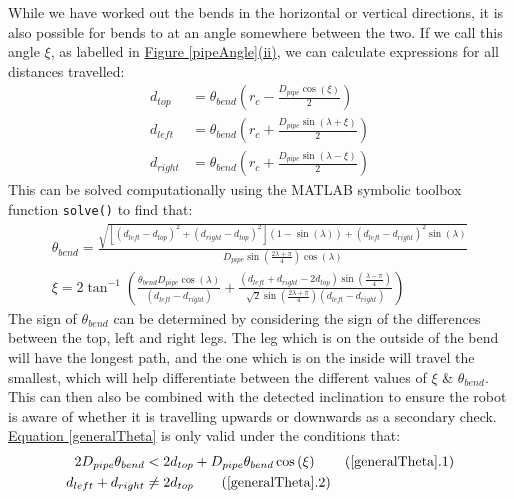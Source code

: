 \documentclass[11pt]{article}		%
\begin{document}
		While we have worked out the bends in the horizontal or vertical directions, it is also possible for bends to at an angle somewhere between the two.
		If we call this angle $\xi$, as labelled in \hyperref[pipeAngle]{Figure \ref*{pipeAngle}(ii)}, we can calculate expressions for all distances travelled:
		\begin{align}
			d_{top} &= \theta_{bend} \left( r_c - \frac{D_{pipe} \cos \left( \xi \right)}{2} \right) \label{d_top}
			\\
			d_{left} &= \theta_{bend} \left( r_c +  \frac{D_{pipe} \sin \left( \lambda + \xi \right)}{2} \right) \label{d_left}
			\\
			d_{right} &= \theta_{bend} \left( r_c +  \frac{D_{pipe} \sin \left( \lambda - \xi \right)}{2} \right) \label{d_right}
		\end{align}
		This can be solved computationally using the MATLAB symbolic toolbox function \verb|solve()| to find that:
		\begin{align}
			\theta_{bend} = \frac{ \sqrt{ \left[ \left( d_{left} - d_{top} \right)^2 + \left( d_{right} - d_{top} \right)^2 \right] \left( 1 - \sin \left( \lambda \right) \right)  + \left( d_{left} - d_{right} \right)^2 \sin \left( \lambda \right) } } {D_{pipe} \sin \left( \frac{2 \lambda + \pi}{4} \right) \cos \left( \lambda \right)} \label{generalTheta}
			\\
			\xi = 2 \tan^{-1} \left( \frac{\theta_{bend} D_{pipe} \cos \left( \lambda \right)}{\left( d_{left} - d_{right} \right)} + \frac{\left(d_{left} + d_{right} - 2 d_{top} \right) \sin \left( \frac{\lambda - \pi}{4} \right)}{\sqrt{2} \sin \left( \frac{2 \lambda + \pi}{4} \right) \left( d_{left} - d_{right} \right)}\right) \label{alphaEq}
		\end{align}
		The sign of $\theta_{bend}$ can be determined by considering the sign of the differences between the top, left and right legs.
		The leg which is on the outside of the bend will have the longest path, and the one which is on the inside will travel the smallest, which will help differentiate between the different values of $\xi$ \& $\theta_{bend}$.
		This can then also be combined with the detected inclination to ensure the robot is aware of whether it is travelling upwards or downwards as a secondary check.
		\\
		\hyperref[generalTheta]{Equation \ref*{generalTheta}} is only valid under the conditions that:
		\begin{align*}
			2 D_{pipe} \theta_{bend} &< 2 d_{top} + D_{pipe} \theta_{bend} \cos \left( \xi \right) \tag{\ref*{generalTheta}.1} \label{thetaCond1}
			\\
			d_{left} + d_{right} &\neq 2 d_{top} \tag{\ref*{generalTheta}.2} \label{thetaCond2}
		\end{align*}
\end{document}
